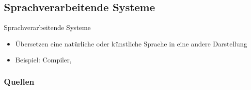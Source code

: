 \documentclass{beamer}
\begin{document}
		\subsection{Sprachverarbeitende Systeme}
			\begin{frame}{Sprachverarbeitende Systeme}
				\begin{itemize}
					\item Übersetzen eine natürliche oder künstliche Sprache in eine andere Darstellung \cite[S. 207]{sommer}
					\item Beispiel: Compiler, 
				\end{itemize}
			\end{frame}
	\begin{frame}[allowframebreaks]
		\frametitle{Quellen}
		\printbibliography[heading=none]
	\end{frame}
\end{document}
